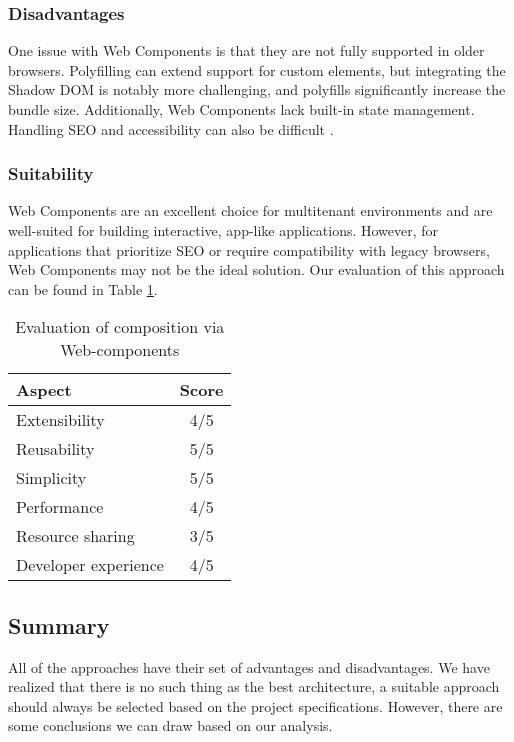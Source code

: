 \subsubsection{Disadvantages}
One issue with Web Components is that they are not fully supported in older browsers. Polyfilling can extend support for custom elements, but integrating the Shadow DOM is notably more challenging, and polyfills significantly increase the bundle size. Additionally, Web Components lack built-in state management. Handling SEO and accessibility can also be difficult \cite{Geers}\cite{MezzaliraBuildingMf}.

\subsubsection{Suitability}
Web Components are an excellent choice for multitenant environments and are well-suited for building interactive, app-like applications. However, for applications that prioritize SEO or require compatibility with legacy browsers, Web Components may not be the ideal solution.  Our evaluation of this approach can be found in Table \ref{table:web-compoents-evaluation}. 
\begin{table}[h]
  \centering
  \begin{tabular}{|p{4cm}|c|}
    \hline
      \textbf{Aspect} & \textbf{Score} \\
    \hline
      Extensibility & 4/5 \\
    \hline
      Reusability & 5/5 \\
    \hline
      Simplicity & 5/5 \\
    \hline
      Performance & 4/5 \\
    \hline
      Resource sharing & 3/5 \\
    \hline
      Developer experience & 4/5 \\
    \hline
  \end{tabular}
  \caption{Evaluation of composition via Web-components}
  \label{table:web-compoents-evaluation}
\end{table}

\subsection{Summary}
All of the approaches have their set of advantages and disadvantages. We have realized that there is no such thing as the best architecture, a suitable approach should always be selected based on the project specifications. However, there are some conclusions we can draw based on our analysis.

